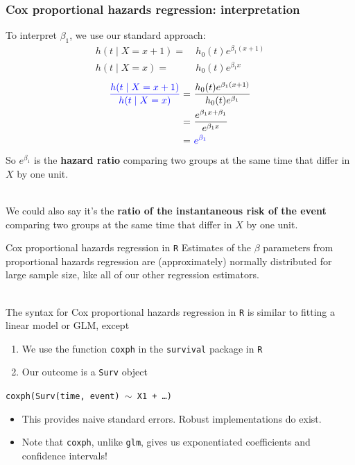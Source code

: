 \documentclass[10pt,t]{beamer}
\begin{document}
\begin{frame}
\frametitle{Cox proportional hazards regression: interpretation}
\vspace{-0.5cm}
To interpret $\beta_1$, we use our standard approach: 
\begin{align*}
h(t \mid X = x + 1) = & \ h_0(t)e^{\beta_1 (x + 1)}\\
h(t \mid X = x) = & \ h_0(t)e^{\beta_1 x} 
\end{align*}\pause \vspace{-0.3cm}
\begin{align*}
\textcolor{blue}{\frac{h(t \mid X = x + 1)}{h(t \mid X = x)}} = & \ \frac{h_0(t)e^{\beta_1 (x + 1)}}{h_0(t)e^{\beta_1}} \\
=& \ \frac{e^{\beta_1x + \beta_1}}{e^{\beta_1 x}} \\
=& \ \textcolor{blue}{e^{\beta_1 }}
\end{align*}
So $e^{\beta_1}$ is the \textbf{hazard ratio} comparing two groups at the same time that differ in $X$ by one unit. 
\\ ~\ 

We could also say it's the  \textbf{ratio of the instantaneous risk of the event} comparing two groups at the same time that differ in $X$ by one unit.
\end{frame}

\begin{frame}{Cox proportional hazards regression in \texttt{R}}
	Estimates of the $\beta$ parameters from proportional hazards regression are (approximately) normally distributed for large sample size, like all of our other regression estimators.
	\\ ~\ 

	The syntax for Cox proportional hazards regression in \texttt{R} is similar to fitting a linear model or GLM, except
	\begin{enumerate}
		\item We use the function \texttt{coxph} in the \texttt{survival} package in \texttt{R}
		\item Our outcome is a \texttt{Surv} object
	\end{enumerate}
	\begin{center}
		\texttt{coxph(Surv(time, event) $\sim$ X1 + \dots)}
	\end{center}
	\begin{itemize}
	\item This provides naive standard errors. Robust implementations do exist.
	\item Note that \texttt{coxph}, unlike \texttt{glm}, gives us exponentiated coefficients and confidence intervals! 
\end{itemize}
\end{frame}
\end{document}
